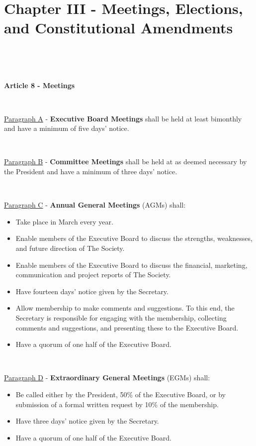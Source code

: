\section{Chapter III - Meetings, Elections, and Constitutional Amendments}

~

~

\large{\textbf{Article 8 - Meetings}}

~

\underline{Paragraph A} - \textbf{Executive Board Meetings} shall be
held at least bimonthly and have a minimum of five days' notice.

~

\underline{Paragraph B} - \textbf{Committee Meetings} shall be
held at as deemed necessary by the President and have a minimum of three days' notice.

~

\underline{Paragraph C} - \textbf{Annual General Meetings} (AGMs) shall:

\begin{itemize}

    \item{Take place in March every year.}

    \item{Enable members of the Executive Board to discuss the strengths, weaknesses, and future direction of The Society.}

    \item{Enable members of the Executive Board to discuss the financial, marketing, communication and project reports of The Society.}

    \item{Have fourteen days' notice given by the Secretary.}

    \item{Allow membership to make comments and suggestions. To this end, the Secretary is responsible for engaging with the membership, collecting comments and suggestions, and presenting these to the Executive Board.}

    \item{Have a quorum of one half of the Executive Board.}

\end{itemize}

~

\underline{Paragraph D} - \textbf{Extraordinary General Meetings} (EGMs)
shall:

\begin{itemize}

    \item{Be called either by the President, 50\% of the Executive Board, or by submission of a formal written request by 10\% of the membership.}

    \item{Have three days' notice given by the Secretary.}

    \item{Have a quorum of one half of the Executive Board.}

\end{itemize}

